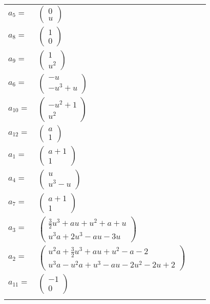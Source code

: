 \documentclass[1p]{elsarticle_modified}
\theoremstyle{definition}
\begin{document}
\begin{tabular}{m{7pt} m{180pt} m{7pt} m{180pt} }
\flushright $a_{5}=$&$\begin{pmatrix}0\\u\end{pmatrix}$ \\
\flushright $a_{8}=$&$\begin{pmatrix}1\\0\end{pmatrix}$ \\
\flushright $a_{9}=$&$\begin{pmatrix}1\\u^2\end{pmatrix}$ \\
\flushright $a_{6}=$&$\begin{pmatrix}- u\\- u^3+u\end{pmatrix}$ \\
\flushright $a_{10}=$&$\begin{pmatrix}- u^2+1\\u^2\end{pmatrix}$ \\
\flushright $a_{12}=$&$\begin{pmatrix}a\\1\end{pmatrix}$ \\
\flushright $a_{1}=$&$\begin{pmatrix}a+1\\1\end{pmatrix}$ \\
\flushright $a_{4}=$&$\begin{pmatrix}u\\u^3- u\end{pmatrix}$ \\
\flushright $a_{7}=$&$\begin{pmatrix}a+1\\1\end{pmatrix}$ \\
\flushright $a_{3}=$&$\begin{pmatrix}\frac{3}{2} u^3+a u+u^2+a+u\\u^3 a+2 u^3- a u-3 u\end{pmatrix}$ \\
\flushright $a_{2}=$&$\begin{pmatrix}u^2 a+\frac{3}{2} u^3+a u+u^2- a-2\\u^3 a- u^2 a+u^3- a u-2 u^2-2 u+2\end{pmatrix}$ \\
\flushright $a_{11}=$&$\begin{pmatrix}-1\\0\end{pmatrix}$\\&\end{tabular}
\end{document}
